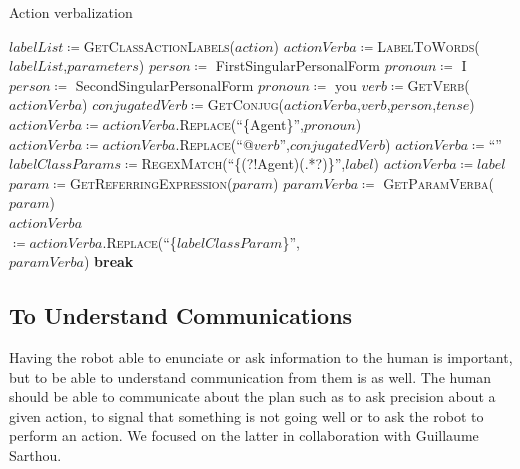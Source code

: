 \documentclass[a4paper,11pt,twoside]{StyleThese}
\begin{document}
\begin{algorithm}[!htb]
	\caption{Action verbalization}
	\label{chap6:algo:action_verba}
	\begin{algorithmic}
	\State $labelList \coloneqq$\textsc{GetClassActionLabels($action$)}
	\State $actionVerba \coloneqq$\textsc{LabelToWords}($labelList$,$parameters$)
		\State $person \coloneqq$ FirstSingularPersonalForm
		\State $pronoun \coloneqq$ I
		\State $person \coloneqq$ SecondSingularPersonalForm
		\State $pronoun \coloneqq$ you
	\EndIf
	\State $verb \coloneqq$\textsc{GetVerb}($actionVerba$)
	\State $conjugatedVerb \coloneqq$\textsc{GetConjug}($actionVerba$,$verb$,$person$,$tense$)
	\State $actionVerba \coloneqq actionVerba.$\textsc{Replace}(``\{Agent\}'',$pronoun$)
	\State $actionVerba \coloneqq actionVerba.$\textsc{Replace}(``@$verb$'',$conjugatedVerb$)
	\EndFunction
	\Statex
	\State $actionVerba \coloneqq$``''
		\State $labelClassParams \coloneqq$\textsc{RegexMatch}(``\{(?!Agent)(.*?)\}'',$label$)
			 
					\State $actionVerba \coloneqq label$
				\EndIf
					\State $param \coloneqq$\textsc{GetReferringExpression($param$)}
				\Else
					\State $paramVerba \coloneqq$ \textsc{GetParamVerba($param$)}\\\hfill{}
				\EndIf
				\State $actionVerba$ \\\hfill $\coloneqq actionVerba.$\textsc{Replace}(``\{$labelClassParam$\}'',\\\hfill$paramVerba$)
				\State \textbf{break}
			\EndIf
			\EndFor
		\EndFor
		\EndIf
	\EndFor
	\EndFunction
	\end{algorithmic}
\end{algorithm}	
	


\subsection{To Understand Communications}\label{chap6:subsec:und_comm}
Having the robot able to enunciate or ask information to the human is important, but to be able to understand communication from them is as well. The human should be able to communicate about the plan such as to ask precision about a given action, to signal that something is not going well or to ask the robot to perform an action. We focused on the latter in collaboration with Guillaume Sarthou. 
\end{document}

